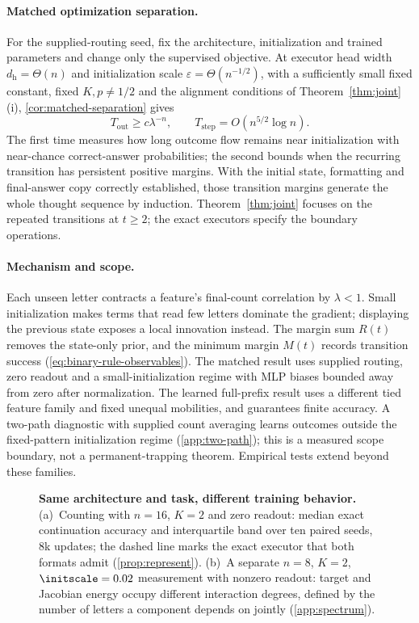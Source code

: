 \paragraph{Matched optimization separation.}
For the supplied-routing seed, fix the architecture, initialization and trained parameters
and change only the supervised objective. At executor head width $d_{\mathrm h}=\Theta(n)$
and initialization scale $\varepsilon=\Theta(n^{-1/2})$, with a sufficiently small fixed
constant, fixed $K,p\ne1/2$ and the alignment conditions of Theorem~\ref{thm:joint}(i), \cref{cor:matched-separation} gives
\[
 T_{\mathrm{out}}\ge c\lambda^{-n},\qquad
 T_{\mathrm{step}}=O(n^{5/2}\log n).
\]
The first time measures how long outcome flow remains near initialization with
near-chance correct-answer probabilities;
the second bounds when the recurring transition has persistent positive margins.
With the initial state, formatting and final-answer copy correctly established, those
transition margins generate the whole thought sequence by induction. Theorem~\ref{thm:joint}
focuses on the repeated transitions at $t\ge2$; the exact executors specify the boundary operations.

\paragraph{Mechanism and scope.}
Each unseen letter contracts a feature's final-count correlation by $\lambda<1$.
Small initialization makes terms that read few letters dominate the gradient; displaying
the previous state exposes a local innovation instead. The margin sum $R(t)$ removes the
state-only prior, and the minimum margin $M(t)$ records transition success
(\cref{eq:binary-rule-observables}). The matched result uses supplied routing, zero readout
and a small-initialization regime with MLP biases bounded away from zero after normalization.
The learned full-prefix result uses a different tied feature family and fixed unequal
mobilities, and guarantees finite accuracy. A two-path diagnostic with supplied
count averaging learns outcomes outside the fixed-pattern initialization regime
(\cref{app:two-path}); this is a measured scope boundary, not a permanent-trapping theorem.
Empirical tests extend beyond these families.

\begin{figure}[t]
\centering

\caption{\textbf{Same architecture and task, different training behavior.}
(a)~Counting with $n=16$, $K=2$ and zero readout: median exact continuation accuracy and interquartile band over ten paired seeds, $8$k
updates; the dashed line marks the exact executor that both formats admit (\cref{prop:represent}).
(b)~A separate $n=8$, $K=2$, $\initscale=0.02$ measurement with nonzero readout: target and Jacobian energy occupy different interaction degrees, defined by the number of letters a component depends on jointly (\cref{app:spectrum}).}
\label{fig:overview}
\end{figure}

